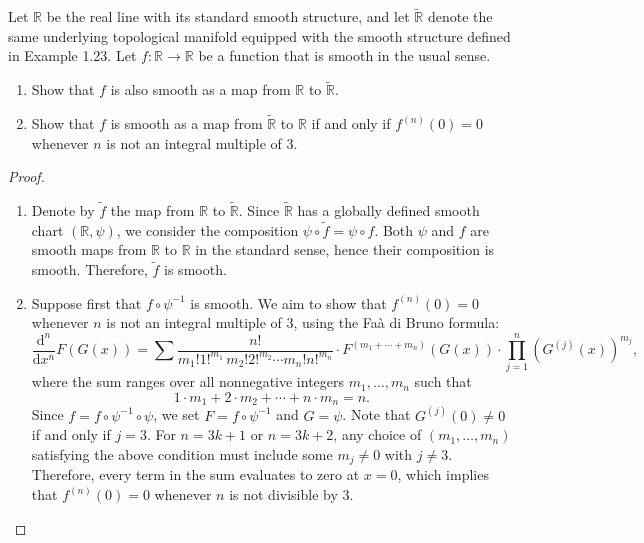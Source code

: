 \begin{problem}
    Let $\mathbb{R}$ be the real line with its standard smooth structure, and let $\tilde{\mathbb{R}}$ denote the same underlying topological manifold equipped with the smooth structure defined in Example 1.23. Let $f \colon \mathbb{R} \to \mathbb{R}$ be a function that is smooth in the usual sense.
    \begin{enumerate}
        \item Show that $f$ is also smooth as a map from $\mathbb{R}$ to $\tilde{\mathbb{R}}$.
        \item Show that $f$ is smooth as a map from $\tilde{\mathbb{R}}$ to $\mathbb{R}$ if and only if $f^{(n)}(0) = 0$ whenever $n$ is not an integral multiple of $3$.
    \end{enumerate}
    \begin{proof}
        \begin{enumerate}
            \item Denote by $\tilde{f}$ the map from $\mathbb{R}$ to $\tilde{\mathbb{R}}$. Since $\tilde{\mathbb{R}}$ has a globally defined smooth chart $(\mathbb{R}, \psi)$, we consider the composition $\psi \circ \tilde{f} = \psi \circ f$. Both $\psi$ and $f$ are smooth maps from $\mathbb{R}$ to $\mathbb{R}$ in the standard sense, hence their composition is smooth. Therefore, $\tilde{f}$ is smooth.
            
            \item Suppose first that $f \circ \psi^{-1}$ is smooth. We aim to show that $f^{(n)}(0) = 0$ whenever $n$ is not an integral multiple of $3$, using the Faà di Bruno formula:
            \[
            \frac{\mathrm{d}^n}{\mathrm{d}x^n} F(G(x)) = \sum \frac{n!}{m_1!1!^{m_1} \, m_2!2!^{m_2} \cdots m_n!n!^{m_n}} 
            \cdot F^{(m_1 + \cdots + m_n)}(G(x)) 
            \cdot \prod_{j=1}^{n} \left( G^{(j)}(x) \right)^{m_j},
            \]
            where the sum ranges over all nonnegative integers $m_1, \ldots, m_n$ such that
            \[
            1 \cdot m_1 + 2 \cdot m_2 + \cdots + n \cdot m_n = n.
            \]
            Since $f = f \circ \psi^{-1} \circ \psi$, we set $F = f \circ \psi^{-1}$ and $G = \psi$. Note that $G^{(j)}(0) \neq 0$ if and only if $j = 3$. For $n = 3k+1$ or $n = 3k+2$, any choice of $(m_1, \ldots, m_n)$ satisfying the above condition must include some $m_j \neq 0$ with $j \neq 3$. Therefore, every term in the sum evaluates to zero at $x = 0$, which implies that $f^{(n)}(0) = 0$ whenever $n$ is not divisible by $3$.


\end{enumerate}
\end{proof}
\end{problem}
